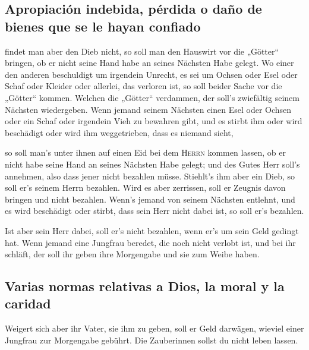 \hypertarget{apropiaciuxf3n-indebida-puxe9rdida-o-dauxf1o-de-bienes-que-se-le-hayan-confiado}{%
\subsection{Apropiación indebida, pérdida o daño de bienes que se le
hayan
confiado}\label{apropiaciuxf3n-indebida-puxe9rdida-o-dauxf1o-de-bienes-que-se-le-hayan-confiado}}

 findet man aber den Dieb nicht, so soll man den Hauswirt
vor die „Götter`` bringen, ob er nicht seine Hand habe an seines
Nächsten Habe gelegt.  Wo einer den anderen beschuldigt um
irgendein Unrecht, es sei um Ochsen oder Esel oder Schaf oder Kleider
oder allerlei, das verloren ist, so soll beider Sache vor die „Götter``
kommen. Welchen die „Götter`` verdammen, der soll's zwiefältig seinem
Nächsten wiedergeben.  Wenn jemand seinem Nächsten einen
Esel oder Ochsen oder ein Schaf oder irgendein Vieh zu bewahren gibt,
und es stirbt ihm oder wird beschädigt oder wird ihm weggetrieben, dass
es niemand sieht,

 so soll man's unter ihnen auf einen Eid bei dem
\textsc{Herrn} kommen lassen, ob er nicht habe seine Hand an seines
Nächsten Habe gelegt; und des Gutes Herr soll's annehmen, also dass
jener nicht bezahlen müsse.  Stiehlt's ihm aber ein Dieb,
so soll er's seinem Herrn bezahlen.  Wird es aber
zerrissen, soll er Zeugnis davon bringen und nicht bezahlen.
 Wenn's jemand von seinem Nächsten entlehnt, und es wird
beschädigt oder stirbt, dass sein Herr nicht dabei ist, so soll er's
bezahlen.

 Ist aber sein Herr dabei, soll er's nicht bezahlen, wenn
er's um sein Geld gedingt hat.  Wenn jemand eine Jungfrau
beredet, die noch nicht verlobt ist, und bei ihr schläft, der soll ihr
geben ihre Morgengabe und sie zum Weibe haben.

\hypertarget{varias-normas-relativas-a-dios-la-moral-y-la-caridad}{%
\subsection{Varias normas relativas a Dios, la moral y la
caridad}\label{varias-normas-relativas-a-dios-la-moral-y-la-caridad}}

 Weigert sich aber ihr Vater, sie ihm zu geben, soll er
Geld darwägen, wieviel einer Jungfrau zur Morgengabe gebührt.
 Die Zauberinnen sollst du nicht leben lassen.

